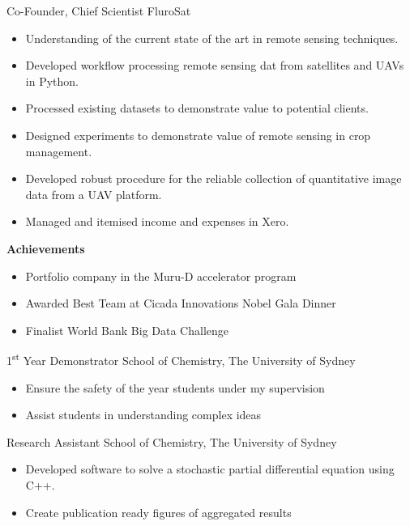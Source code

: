 {Co-Founder, Chief Scientist}
{FluroSat}{}{}
{%
  \begin{itemize}
    \item Understanding of the current state of the art in remote sensing techniques.
    \item Developed workflow processing remote sensing dat from satellites and UAVs in Python.
    \item Processed existing datasets to demonstrate value to potential clients.
    \item Designed experiments to demonstrate value of remote sensing in crop management.
    \item Developed robust procedure for the reliable collection of quantitative image data from a UAV platform.
    \item Managed and itemised income and expenses in Xero.
  \end{itemize}
  \textbf{Achievements}
  \begin{itemize}
    \item Portfolio company in the Muru-D accelerator program
    \item Awarded Best Team at Cicada Innovations Nobel Gala Dinner
    \item Finalist World Bank Big Data Challenge
  \end{itemize}
}
\vspace{1em}

{1\textsuperscript{st} Year Demonstrator}
{School of Chemistry, The University of Sydney}
{}{}
{%
    \begin{itemize}
      \item Ensure the safety of the  year students under my supervision
      \item Assist students in understanding complex ideas
    \end{itemize}
}
\vspace{1em}

{Research Assistant}
{School of Chemistry, The University of Sydney}
{}{}{%
  \begin{itemize}
    \item Developed software to solve a stochastic partial differential equation using C++.
    \item Create publication ready figures of aggregated results
  \end{itemize}
}
\vspace{1em}

